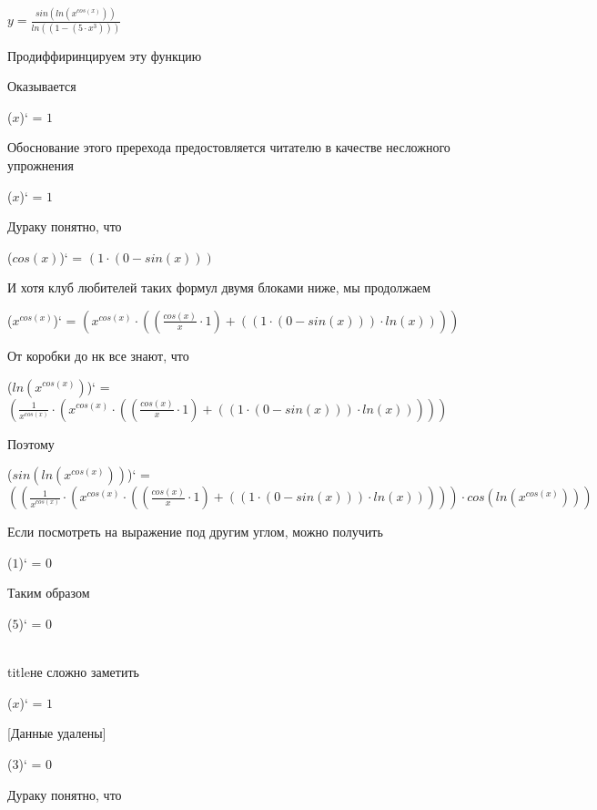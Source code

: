 \documentclass[12pt,a4paper,fleqn]{article}
\begin{document}
$y = $$\frac{sin(ln(x^{cos(x)}))}{ln((1 - (5 \cdot x^{3})))}$

 Продиффиринцируем эту функцию

Оказывается

\begin{center}
($x$)`
 = $1$\end{center}
Обоснование этого пререхода предостовляется читателю в качестве несложного упрожнения

\begin{center}
($x$)`
 = $1$\end{center}
Дураку понятно, что

\begin{center}
($cos(x)$)`
 = $(1 \cdot (0 - sin(x)))$\end{center}
И хотя клуб любителей таких формул двумя блоками ниже, мы продолжаем

\begin{center}
($x^{cos(x)}$)`
 = $(x^{cos(x)} \cdot ((\frac{cos(x)}{x} \cdot 1) + ((1 \cdot (0 - sin(x))) \cdot ln(x))))$\end{center}
От коробки до нк все знают, что

\begin{center}
($ln(x^{cos(x)})$)`
 = $(\frac{1}{x^{cos(x)}} \cdot (x^{cos(x)} \cdot ((\frac{cos(x)}{x} \cdot 1) + ((1 \cdot (0 - sin(x))) \cdot ln(x)))))$\end{center}
Поэтому

\begin{center}
($sin(ln(x^{cos(x)}))$)`
 = $((\frac{1}{x^{cos(x)}} \cdot (x^{cos(x)} \cdot ((\frac{cos(x)}{x} \cdot 1) + ((1 \cdot (0 - sin(x))) \cdot ln(x))))) \cdot cos(ln(x^{cos(x)})))$\end{center}
Если посмотреть на выражение под другим углом, можно получить

\begin{center}
($1$)`
 = $0$\end{center}
Таким образом

\begin{center}
($5$)`
 = $0$\end{center}
\\ title{не сложно заметить} 

\begin{center}
($x$)`
 = $1$\end{center}
[Данные удалены]

\begin{center}
($3$)`
 = $0$\end{center}
Дураку понятно, что
\end{document}
